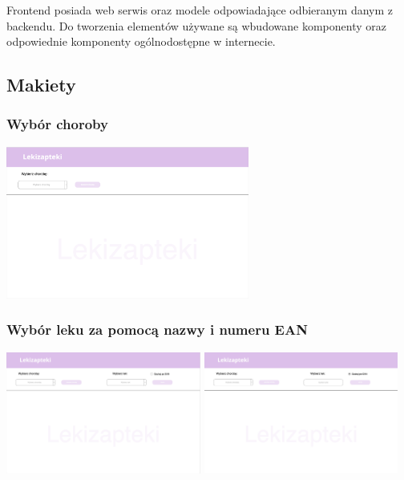 \documentclass{article}
\begin{document}
  Frontend posiada web serwis oraz modele odpowiadające odbieranym danym z backendu.
  Do tworzenia elementów używane są wbudowane komponenty oraz odpowiednie komponenty ogólnodostępne w internecie.

    \subsection{Makiety}
      \subsubsection{Wybór choroby}
      \includegraphics[width=8cm, height=5cm]{lekizapteki-wybor-choroby}

      \subsubsection{Wybór leku za pomocą nazwy i numeru EAN}
      \includegraphics[width=6.4cm, height=4cm]{lekizapteki-wybor-leku-nazwa}
      \includegraphics[width=6.4cm, height=4cm]{lekizapteki-wybor-leku-ean}
\end{document}
